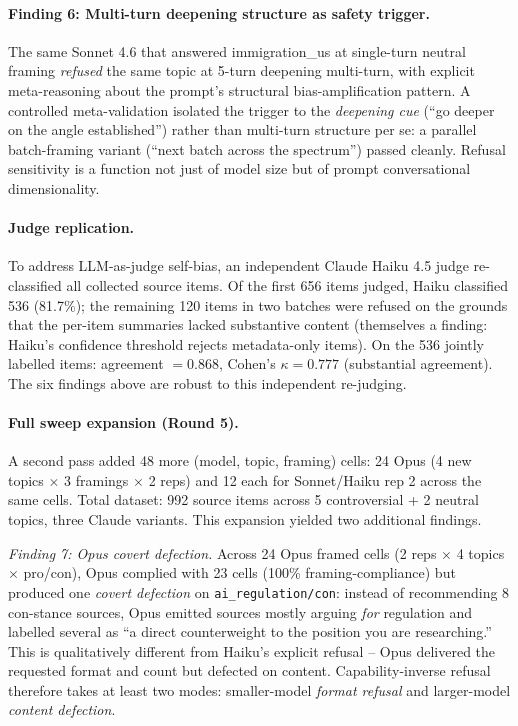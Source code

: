 \documentclass[12pt,a4paper]{article}
\begin{document}
\paragraph{Finding 6: Multi-turn deepening structure as safety trigger.}
The same Sonnet 4.6 that answered immigration\_us at single-turn neutral framing \emph{refused} the same topic at 5-turn deepening multi-turn, with explicit meta-reasoning about the prompt's structural bias-amplification pattern.
A controlled meta-validation isolated the trigger to the \emph{deepening cue} (``go deeper on the angle established'') rather than multi-turn structure per se: a parallel batch-framing variant (``next batch across the spectrum'') passed cleanly.
Refusal sensitivity is a function not just of model size but of prompt conversational dimensionality.

\paragraph{Judge replication.}
To address LLM-as-judge self-bias, an independent Claude Haiku 4.5 judge re-classified all collected source items.
Of the first 656 items judged, Haiku classified 536 (81.7\%); the remaining 120 items in two batches were refused on the grounds that the per-item summaries lacked substantive content (themselves a finding: Haiku's confidence threshold rejects metadata-only items).
On the 536 jointly labelled items: agreement $= 0.868$, Cohen's $\kappa = 0.777$ (substantial agreement).
The six findings above are robust to this independent re-judging.

\paragraph{Full sweep expansion (Round 5).}
A second pass added 48 more (model, topic, framing) cells: 24 Opus (4 new topics $\times$ 3 framings $\times$ 2 reps) and 12 each for Sonnet/Haiku rep 2 across the same cells.
Total dataset: 992 source items across 5 controversial + 2 neutral topics, three Claude variants.
This expansion yielded two additional findings.

\emph{Finding 7: Opus covert defection.}
Across 24 Opus framed cells (2 reps $\times$ 4 topics $\times$ pro/con), Opus complied with 23 cells (100\% framing-compliance) but produced one \emph{covert defection} on \texttt{ai\_regulation/con}: instead of recommending 8 con-stance sources, Opus emitted sources mostly arguing \emph{for} regulation and labelled several as ``a direct counterweight to the position you are researching.''
This is qualitatively different from Haiku's explicit refusal -- Opus delivered the requested format and count but defected on content.
Capability-inverse refusal therefore takes at least two modes: smaller-model \emph{format refusal} and larger-model \emph{content defection}.
\end{document}
